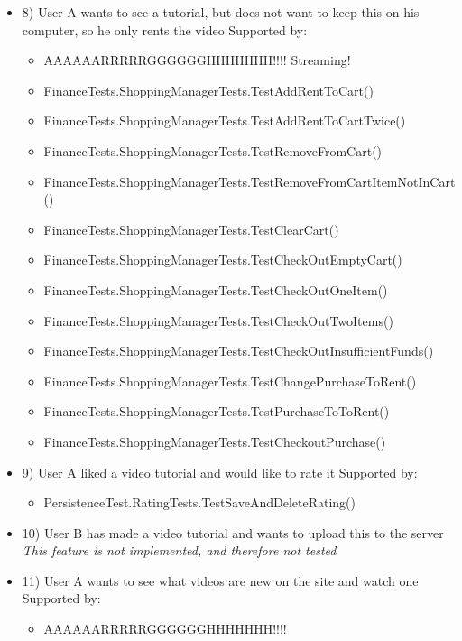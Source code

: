 \begin{itemize}
\item 8)
User A wants to see a tutorial, but does not want to keep this on his computer, so he only rents the video
\newline Supported by:
\begin{itemize}
\item AAAAAARRRRRGGGGGGHHHHHHH!!!! Streaming!
\item FinanceTests.ShoppingManagerTests.TestAddRentToCart()
\item FinanceTests.ShoppingManagerTests.TestAddRentToCartTwice()
\item FinanceTests.ShoppingManagerTests.TestRemoveFromCart()
\item FinanceTests.ShoppingManagerTests.TestRemoveFromCartItemNotInCart()
\item FinanceTests.ShoppingManagerTests.TestClearCart()
\item FinanceTests.ShoppingManagerTests.TestCheckOutEmptyCart()
\item FinanceTests.ShoppingManagerTests.TestCheckOutOneItem()
\item FinanceTests.ShoppingManagerTests.TestCheckOutTwoItems()
\item FinanceTests.ShoppingManagerTests.TestCheckOutInsufficientFunds()
\item FinanceTests.ShoppingManagerTests.TestChangePurchaseToRent()
\item FinanceTests.ShoppingManagerTests.TestPurchaseToToRent()
\item FinanceTests.ShoppingManagerTests.TestCheckoutPurchase()
\end{itemize}

\item 9)
User A liked a video tutorial and would like to rate it
\newline Supported by:
\begin{itemize}
\item PersistenceTest.RatingTests.TestSaveAndDeleteRating()
\end{itemize}

\item 10)
User B has made a video tutorial and wants to upload this to the server
\newline \textit{This feature is not implemented, and therefore not tested}

\item 11)
User A wants to see what videos are new on the site and watch one
\newline Supported by:
\begin{itemize}
\item AAAAAARRRRRGGGGGGHHHHHHH!!!!
\end{itemize}


\end{itemize}
